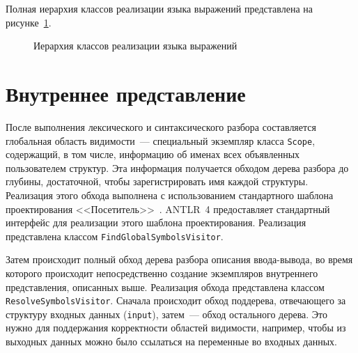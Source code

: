 \documentclass[times,specification,annotation]{style/itmo-student-thesis/itmo-student-thesis}
\begin{document}
Полная иерархия классов реализации языка выражений представлена на рисунке~\ref{pl-classes-hierarchy}.

\begin{figure}[!h]
\caption{Иерархия классов реализации языка выражений}\label{pl-classes-hierarchy}
\centering
{}%

\end{figure}

\section{Внутреннее представление}

После выполнения лексического и синтаксического разбора составляется глобальная область видимости~--- специальный экземпляр класса \texttt{Scope}, содержащий, в том числе, информацию об именах всех объявленных пользователем структур. Эта информация получается обходом дерева разбора до глубины, достаточной, чтобы зарегистрировать имя каждой структуры. Реализация этого обхода выполнена с использованием стандартного шаблона проектирования <<Посетитель>>~\cite{design-patterns}. ANTLR~4 предоставляет стандартный интерфейс для реализации этого шаблона проектирования. Реализация представлена классом \texttt{FindGlobalSymbolsVisitor}.

Затем происходит полный обход дерева разбора описания ввода-вывода, во время которого происходит непосредственно создание экземпляров внутреннего представления, описанных выше. Реализация обхода представлена классом \texttt{ResolveSymbolsVisitor}. Сначала происходит обход поддерева, отвечающего за структуру входных данных (\texttt{input}), затем~--- обход остального дерева. Это нужно для поддержания корректности областей видимости, например, чтобы из выходных данных можно было ссылаться на переменные во входных данных.
\end{document}
